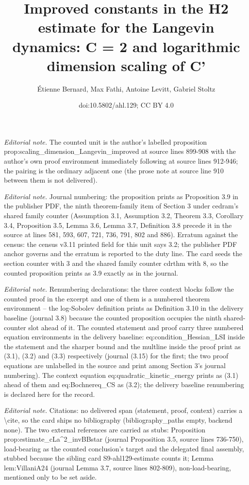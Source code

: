 \documentclass[10pt,a4paper]{article}
\title{Improved constants in the H2 estimate for the Langevin dynamics: C = 2 and logarithmic dimension scaling of C'}
\author{Étienne Bernard, Max Fathi, Antoine Levitt, Gabriel Stoltz}
\date{doi:10.5802/ahl.129; CC BY 4.0}
\numberwithin{equation}{section}
\begin{document}
\maketitle
\setcounter{section}{3}
\setcounter{cdrthm}{8}
\setcounter{equation}{0}
\noindent\textit{Editorial note.} The counted unit is the author's labelled proposition prop:scaling\_dimension\_Langevin\_improved at source lines 899-908 with the author's own proof environment immediately following at source lines 912-946; the pairing is the ordinary adjacent one (the prose note at source line 910 between them is not delivered).\par\medskip
\noindent\textit{Editorial note.} Journal numbering: the proposition prints as Proposition 3.9 in the publisher PDF, the ninth theorem-family item of Section 3 under cedram's shared family counter (Assumption 3.1, Assumption 3.2, Theorem 3.3, Corollary 3.4, Proposition 3.5, Lemma 3.6, Lemma 3.7, Definition 3.8 precede it in the source at lines 581, 593, 607, 721, 736, 791, 802 and 886). Erratum against the census: the census v3.11 printed field for this unit says 3.2; the publisher PDF anchor governs and the erratum is reported to the duty line. The card seeds the section counter with 3 and the shared family counter cdrthm with 8, so the counted proposition prints as 3.9 exactly as in the journal.\par\medskip
\noindent\textit{Editorial note.} Renumbering declarations: the three context blocks follow the counted proof in the excerpt and one of them is a numbered theorem environment -- the log-Sobolev definition prints as Definition 3.10 in the delivery baseline (journal 3.8) because the counted proposition occupies the ninth shared-counter slot ahead of it. The counted statement and proof carry three numbered equation environments in the delivery baseline: eq:condition\_Hessian\_LSI inside the statement and the sharper bound and the multline inside the proof print as (3.1), (3.2) and (3.3) respectively (journal (3.15) for the first; the two proof equations are unlabelled in the source and print among Section 3's journal numbering). The context equation eq:quadratic\_kinetic\_energy prints as (3.1) ahead of them and eq:Bochnereq\_CS as (3.2); the delivery baseline renumbering is declared here for the record.\par\medskip
\noindent\textit{Editorial note.} Citations: no delivered span (statement, proof, context) carries a \textbackslash{}cite, so the card ships no bibliography (bibliography\_paths empty, backend none). The two external references are carried as stubs: Proposition prop:estimate\_cLa\textasciicircum{}2\_invBBstar (journal Proposition 3.5, source lines 736-750), load-bearing as the counted conclusion's target and the delegated final assembly, stubbed because the sibling card S9-ahl129-estimate counts it; Lemma lem:VillaniA24 (journal Lemma 3.7, source lines 802-809), non-load-bearing, mentioned only to be set aside.\par\medskip
\end{document}
